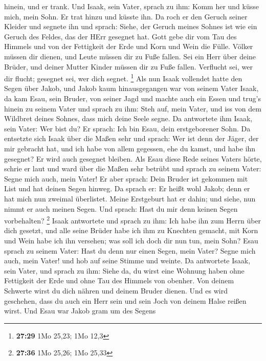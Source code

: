 hinein, und er trank.  Und Isaak, sein Vater, sprach zu
ihm: Komm her und küsse mich, mein Sohn.  Er trat hinzu und
küsste ihn. Da roch er den Geruch seiner Kleider und segnete ihn und
sprach: Siehe, der Geruch meines Sohnes ist wie ein Geruch des Feldes,
das der HErr gesegnet hat.  Gott gebe dir vom Tau des
Himmels und von der Fettigkeit der Erde und Korn und Wein die Fülle.
 Völker müssen dir dienen, und Leute müssen dir zu Fuße
fallen. Sei ein Herr über deine Brüder, und deiner Mutter Kinder müssen
dir zu Fuße fallen. Verflucht sei, wer dir flucht; gesegnet sei, wer
dich segnet. \footnote{\textbf{27:29} 1Mo 25,23; 1Mo 12,3} 
Als nun Isaak vollendet hatte den Segen über Jakob, und Jakob kaum
hinausgegangen war von seinem Vater Isaak, da kam Esau, sein Bruder, von
seiner Jagd  und machte auch ein Essen und trug's hinein zu
seinem Vater und sprach zu ihm: Steh auf, mein Vater, und iss von dem
Wildbret deines Sohnes, dass mich deine Seele segne.  Da
antwortete ihm Isaak, sein Vater: Wer bist du? Er sprach: Ich bin Esau,
dein erstgeborener Sohn.  Da entsetzte sich Isaak über die
Maßen sehr und sprach: Wer ist denn der Jäger, der mir gebracht hat, und
ich habe von allem gegessen, ehe du kamst, und habe ihn gesegnet? Er
wird auch gesegnet bleiben.  Als Esau diese Rede seines
Vaters hörte, schrie er laut und ward über die Maßen sehr betrübt und
sprach zu seinem Vater: Segne mich auch, mein Vater!  Er
aber sprach: Dein Bruder ist gekommen mit List und hat deinen Segen
hinweg.  Da sprach er: Er heißt wohl Jakob; denn er hat
mich nun zweimal überlistet. Meine Erstgeburt hat er dahin; und siehe,
nun nimmt er auch meinen Segen. Und sprach: Hast du mir denn keinen
Segen vorbehalten? \footnote{\textbf{27:36} 1Mo 25,26; 1Mo 25,33}
 Isaak antwortete und sprach zu ihm: Ich habe ihn zum Herrn
über dich gesetzt, und alle seine Brüder habe ich ihm zu Knechten
gemacht, mit Korn und Wein habe ich ihn versehen; was soll ich doch dir
nun tun, mein Sohn?  Esau sprach zu seinem Vater: Hast du
denn nur einen Segen, mein Vater? Segne mich auch, mein Vater! und hob
auf seine Stimme und weinte.  Da antwortete Isaak, sein
Vater, und sprach zu ihm: Siehe da, du wirst eine Wohnung haben ohne
Fettigkeit der Erde und ohne Tau des Himmels von obenher. 
Von deinem Schwerte wirst du dich nähren und deinem Bruder dienen. Und
es wird geschehen, dass du auch ein Herr sein und sein Joch von deinem
Halse reißen wirst.  Und Esau war Jakob gram um des Segens
